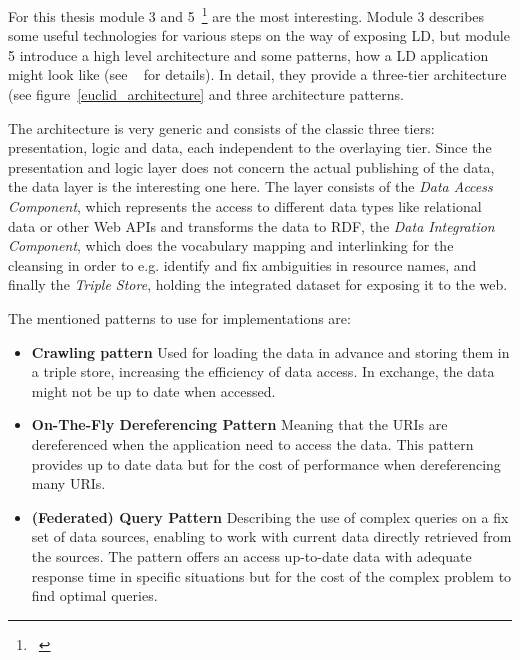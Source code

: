For this thesis module 3 and 5~\footnote{~\cite{euclid:chap5}} are the most interesting. Module 3 describes some useful technologies for various steps on the way of exposing LD, but module 5 introduce a high level architecture and some patterns, how a LD application might look like (see ~\cite{euclid:chap5} for details). In detail, they provide a three-tier architecture (see figure~\ref{euclid_architecture} and three architecture patterns.

The architecture is very generic and consists of the classic three tiers: presentation, logic and data, each independent to the overlaying tier. Since the presentation and logic layer does not concern the actual publishing of the data, the data layer is the interesting one here. The layer consists of the \emph{Data Access Component}, which represents the access to different data types like relational data or other Web APIs and transforms the data to RDF, the \emph{Data Integration Component}, which does the vocabulary mapping and interlinking for the cleansing in order to e.g. identify and fix ambiguities in resource names, and finally the \emph{Triple Store}, holding the integrated dataset for exposing it to the web.

The mentioned patterns to use for implementations are:

\begin{itemize}

\item \textbf{Crawling pattern}
Used for loading the data in advance and storing them in a triple store, 
increasing the efficiency of data access. In exchange, the data might not be up to 
date when accessed.

\item \textbf{On-The-Fly Dereferencing Pattern}
Meaning that the URIs are dereferenced when the application need to access the 
data. This pattern provides up to date data but for the cost of performance when 
dereferencing many URIs.

\item \textbf{(Federated) Query Pattern}
Describing the use of complex queries on a fix set of data sources, enabling to 
work with current data directly retrieved from the sources. The pattern offers an 
access up-to-date data with adequate response time in specific situations but for 
the cost of the complex problem to find optimal queries.
\end{itemize}

